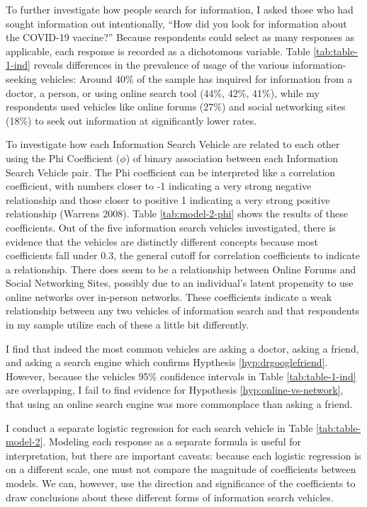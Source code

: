 To further investigate how people search for information, I asked those who had
sought information out intentionally, ``How did you look for information about
the COVID-19 vaccine?'' Because respondents could select as many responses as
applicable, each response is recorded as a dichotomous variable. Table
\ref{tab:table-1-ind} reveals differences in the prevalence of usage of the
various information-seeking vehicles: Around 40\% of the sample has inquired for
information from a doctor, a person, or using online search tool (44\%, 42\%, 41\%), while my
respondents used vehicles like online forums (27\%) and social networking sites (18\%)
to seek out information at significantly lower rates.

To investigate how each
Information Search Vehicle are related to each other using the Phi Coefficient
($\phi$) of binary association between each Information Search Vehicle pair.
The Phi coefficient can be interpreted like a correlation coefficient, with
numbers closer to -1 indicating a very strong negative relationship and those closer to 
positive 1 indicating a very strong positive relationship
(Warrens 2008). Table \ref{tab:model-2-phi} shows the results of these
coefficients. Out of the five information search vehicles investigated, there is
evidence that the vehicles are distinctly different concepts because most
coefficients fall under 0.3, the general cutoff for correlation
coefficients to indicate a relationship. There does seem to be a relationship
between Online Forums and Social Networking Sites, possibly due to an
individual's latent propensity to use online networks over in-person networks. These
coefficients indicate a weak relationship between any two vehicles of
information search and that respondents in my sample utilize each of these a
little bit differently. 

I find that indeed the most common vehicles are 
asking a doctor, asking a friend, and asking a search engine which confirms
Hypthesis \ref{hyp:drgooglefriend}. However, because the vehicles 95\% confidence intervals 
in Table \ref{tab:table-1-ind}
are overlapping, I fail to find evidence for Hypothesis \ref{hyp:online-vs-network},
that using an online search engine was more commonplace than asking a friend. 



I conduct a separate logistic regression for each search vehicle in Table \ref{tab:table-model-2}. 
Modeling each response as a separate formula is useful for interpretation, but
there are important caveats: because each logistic regression is on a different
scale, one must not compare the magnitude of coefficients between models. We
can, however, use the direction and significance of the coefficients to draw
conclusions about these different forms of information search vehicles.

